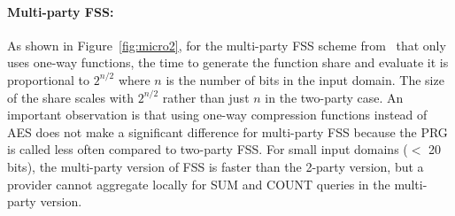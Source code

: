 \paragraph{Multi-party FSS:}
As shown in Figure~\ref{fig:micro2}, for the multi-party FSS 
scheme from~\cite{fss} that only uses one-way functions, 
the time to generate the function share and evaluate it is proportional
to $2^{n/2}$ where $n$ is the number of bits in the input domain. 
The size of the share scales with $2^{n/2}$
rather than just $n$ in the two-party case. 
An important observation is that using one-way compression 
functions instead of AES does not make a significant difference for multi-party 
FSS because the PRG is called less often compared to two-party FSS. 
For small input domains ($<$ 20 bits), 
the multi-party version of FSS is faster than the 2-party version, but 
a provider cannot aggregate locally for SUM and COUNT queries in the multi-party version.

%

